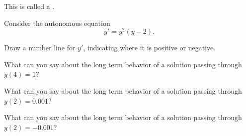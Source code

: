 \begin{applicationActivities}
\begin{observation}
\begin{multicols}{2}
\begin{center}
\end{center}
\end{multicols}

This is called a .
\end{observation}

\begin{activity}{10}
Consider the autonomous equation \[y'=y^2(y-2).\]

\begin{subactivity}
Draw a number line for \(y'\), indicating where it is positive or negative.
\end{subactivity}
\begin{subactivity}
What can you say about the long term behavior of a solution passing through \(y(4)=1\)?
\end{subactivity}
\begin{subactivity}
What can you say about the long term behavior of a solution passing through \(y(2)=0.001\)?
\end{subactivity}
\begin{subactivity}
What can you say about the long term behavior of a solution passing through \(y(2)=-0.001\)?
\end{subactivity}
\end{activity}

\end{applicationActivities}
